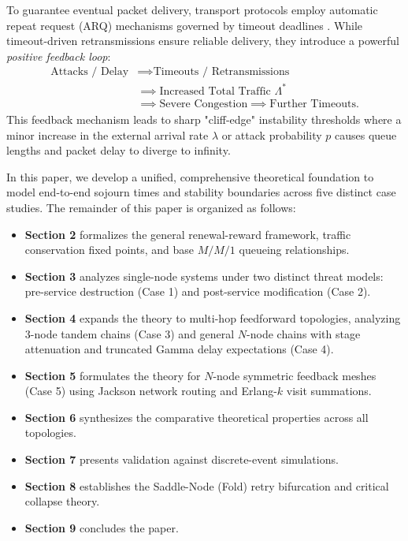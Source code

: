 \documentclass[12pt,onecolumn]{article}
\begin{document}
To guarantee eventual packet delivery, transport protocols employ automatic repeat request (ARQ) mechanisms governed by timeout deadlines \cite{fall1996simulation}. While timeout-driven retransmissions ensure reliable delivery, they introduce a powerful \textit{positive feedback loop}:
\begin{align*}
\text{Attacks / Delay} &\implies \text{Timeouts / Retransmissions} \\
&\implies \text{Increased Total Traffic } \Lambda^* \\
&\implies \text{Severe Congestion} \implies \text{Further Timeouts.}
\end{align*}
This feedback mechanism leads to sharp "cliff-edge" instability thresholds where a minor increase in the external arrival rate $\lambda$ or attack probability $p$ causes queue lengths and packet delay to diverge to infinity.

In this paper, we develop a unified, comprehensive theoretical foundation to model end-to-end sojourn times and stability boundaries across five distinct case studies. The remainder of this paper is organized as follows:
\begin{itemize}
    \item \textbf{Section 2} formalizes the general renewal-reward framework, traffic conservation fixed points, and base $M/M/1$ queueing relationships.
    \item \textbf{Section 3} analyzes single-node systems under two distinct threat models: pre-service destruction (Case 1) and post-service modification (Case 2).
    \item \textbf{Section 4} expands the theory to multi-hop feedforward topologies, analyzing 3-node tandem chains (Case 3) and general $N$-node chains with stage attenuation and truncated Gamma delay expectations (Case 4).
    \item \textbf{Section 5} formulates the theory for $N$-node symmetric feedback meshes (Case 5) using Jackson network routing and Erlang-$k$ visit summations.
    \item \textbf{Section 6} synthesizes the comparative theoretical properties across all topologies.
    \item \textbf{Section 7} presents validation against discrete-event simulations.
    \item \textbf{Section 8} establishes the Saddle-Node (Fold) retry bifurcation and critical collapse theory.
    \item \textbf{Section 9} concludes the paper.
\end{itemize}
\end{document}
